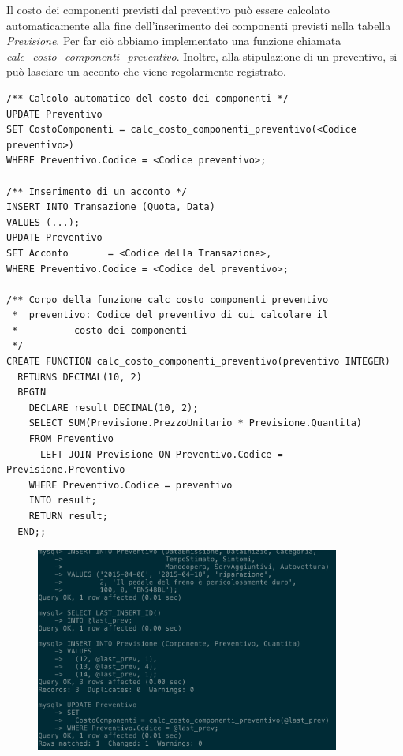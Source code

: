 				Il costo dei componenti previsti dal preventivo può essere calcolato automaticamente alla fine dell'inserimento dei componenti previsti nella tabella \emph{Previsione}. Per far ciò abbiamo implementato una funzione chiamata \emph{calc\_costo\_componenti\_preventivo}.
				Inoltre, alla stipulazione di un preventivo, si può lasciare un acconto che viene regolarmente registrato.

				\begin{lstlisting}
/** Calcolo automatico del costo dei componenti */
UPDATE Preventivo 
SET CostoComponenti = calc_costo_componenti_preventivo(<Codice preventivo>)
WHERE Preventivo.Codice = <Codice preventivo>;

/** Inserimento di un acconto */
INSERT INTO Transazione (Quota, Data)
VALUES (...);
UPDATE Preventivo
SET Acconto       = <Codice della Transazione>,
WHERE Preventivo.Codice = <Codice del preventivo>;

/** Corpo della funzione calc_costo_componenti_preventivo
 *  preventivo: Codice del preventivo di cui calcolare il 
 * 			costo dei componenti
 */
CREATE FUNCTION calc_costo_componenti_preventivo(preventivo INTEGER)
  RETURNS DECIMAL(10, 2)
  BEGIN
    DECLARE result DECIMAL(10, 2);
    SELECT SUM(Previsione.PrezzoUnitario * Previsione.Quantita)
    FROM Preventivo
      LEFT JOIN Previsione ON Preventivo.Codice = Previsione.Preventivo
    WHERE Preventivo.Codice = preventivo
    INTO result;
    RETURN result;
  END;;
				\end{lstlisting}

        \begin{figure}[H]
          \centering
          \includegraphics[width=10cm]{images/screenshots/nuovo_preventivo_1.png}
        \end{figure}

